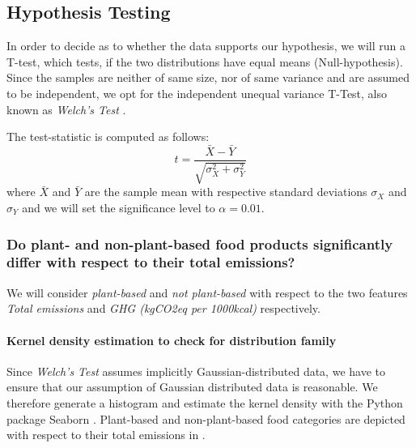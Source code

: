 \documentclass{article}
\begin{document}
\subsection*{Hypothesis Testing}
In order  to decide as to whether the data supports our hypothesis, we will run a T-test, which tests, if the two distributions have equal means (Null-hypothesis).  Since the samples are neither of same size, nor of same variance and are assumed to be independent, we opt for the independent unequal variance T-Test, also known as \textit{Welch's Test} \cite{Welch1947}. 



The test-statistic is computed as follows:
\begin{equation}\label{eq:t-test}
  t = \frac{\bar{X}-\bar{Y}}{\sqrt{\sigma^2_{X}+\sigma^2_{Y}}}
\end{equation}
where $\bar{X}$ and  $\bar{Y}$ are the sample mean with respective standard deviations $\sigma_{X}$ and $\sigma_{Y}$ and we will set the significance level to $\alpha = 0.01$.

\subsubsection*{Do plant- and non-plant-based food products significantly differ with respect to their total emissions?}


 We will consider \textit{plant-based} and \textit{not plant-based} with respect to  the two features \textit{Total emissions} and \textit{GHG (kgCO2eq per 1000kcal)} respectively.
\paragraph*{Kernel density estimation to check for distribution family} Since \textit{Welch's Test} assumes implicitly Gaussian-distributed data, we have to ensure that our assumption of Gaussian distributed data is reasonable.  We therefore generate a histogram and estimate the kernel density with the Python package Seaborn \cite{Seaborn}. Plant-based and non-plant-based food categories are depicted with respect to their total emissions in .
\end{document}

